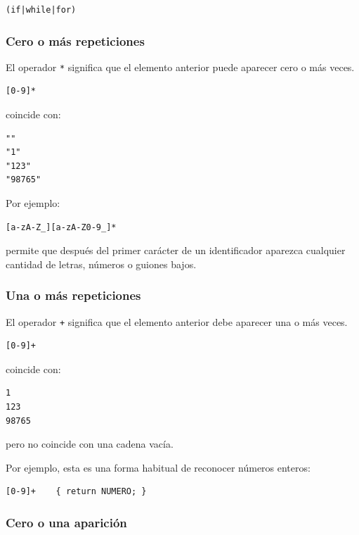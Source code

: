 \documentclass{article}
\begin{document}
\begin{verbatim}
(if|while|for)
\end{verbatim}

\subsubsection{Cero o más repeticiones}

El operador \texttt{*} significa que el elemento anterior puede aparecer
cero o más veces.

\begin{verbatim}
[0-9]*
\end{verbatim}

coincide con:

\begin{verbatim}
""
"1"
"123"
"98765"
\end{verbatim}

Por ejemplo:

\begin{verbatim}
[a-zA-Z_][a-zA-Z0-9_]*
\end{verbatim}

permite que después del primer carácter de un identificador aparezca
cualquier cantidad de letras, números o guiones bajos.

\subsubsection{Una o más repeticiones}

El operador \texttt{+} significa que el elemento anterior debe aparecer
una o más veces.

\begin{verbatim}
[0-9]+
\end{verbatim}

coincide con:

\begin{verbatim}
1
123
98765
\end{verbatim}

pero no coincide con una cadena vacía.

Por ejemplo, esta es una forma habitual de reconocer números enteros:

\begin{verbatim}
[0-9]+    { return NUMERO; }
\end{verbatim}

\subsubsection{Cero o una aparición}
\end{document}
